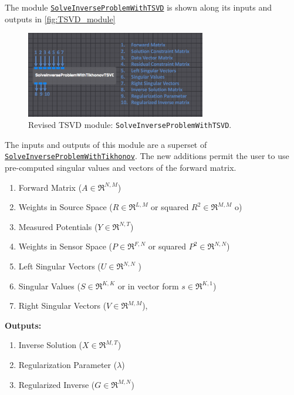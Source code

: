     The module \href{http://scirundocwiki.sci.utah.edu/SCIRunDocs/index.php5/CIBC:Documentation:SCIRun:Reference:BioPSE:SolveInverseProblemWithTSVD}{{\tt SolveInverseProblemWithTSVD}} is shown along its inputs and outputs in \autoref{fig:TSVD_module}
    \begin{figure}
        \begin{center}
        \includegraphics[width=0.7\textwidth]{ECGToolkitGuide_figures/TSVD_module.png}
        \caption{Revised TSVD module: {\tt SolveInverseProblemWithTSVD}.  }
        \label{fig:tik_moduleSVD}
        \end{center}
    \end{figure}
    The inputs and outputs of this module are a superset of \href{http://scirundocwiki.sci.utah.edu/SCIRunDocs/index.php/CIBC:Documentation:SCIRun:Reference:BioPSE:SolveInverseProblemWithTikhonov}{{\tt SolveInverseProblemWithTikhonov}}.
    The new additions permit the user to use pre-computed singular values and vectors of the forward matrix.
    \begin{enumerate}
        \item Forward Matrix ($A\in\Re^{N,M}$)
        \item Weights in Source Space ($R\in\Re^{L,M}$ or squared $R^2\in\Re^{M,M}$ o)
        \item Measured Potentials ($Y\in\Re^{N,T}$)
        \item Weights in Sensor Space ($P\in\Re^{F,N}$ or squared $P^2\in\Re^{N,N}$)
        \item Left Singular Vectors ($U\in\Re^{N,N}$ )
        \item Singular Values ($S\in\Re^{K,K}$ or in vector form $s\in\Re^{K,1}$)
        \item Right Singular Vectors ($V\in\Re^{M,M}$),
    \end{enumerate}
    {\bf Outputs:}
     \begin{enumerate}
        \item Inverse Solution ($X\in\Re^{M,T}$)
        \item Regularization Parameter ($\lambda$)
        \item Regularized Inverse ($G\in\Re^{M,N}$)
    \end{enumerate}


